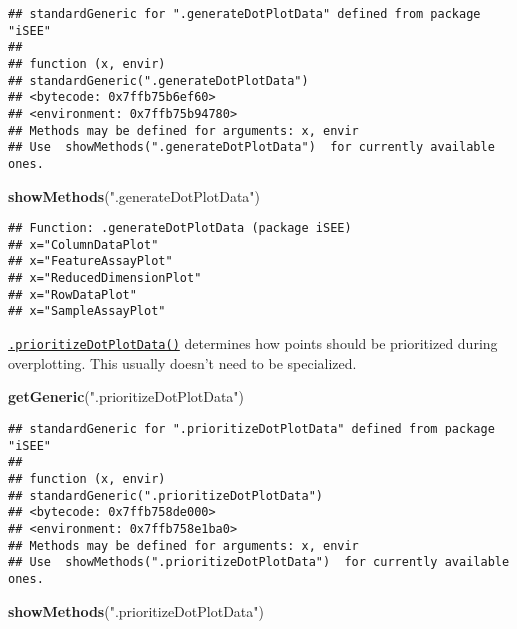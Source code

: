 \documentclass[
]{book}
\newenvironment{Shaded}{\begin{snugshade}}{\end{snugshade}}
\newcommand{\KeywordTok}[1]{\textcolor[rgb]{0.13,0.29,0.53}{\textbf{#1}}}
\newcommand{\NormalTok}[1]{#1}
\newcommand{\StringTok}[1]{\textcolor[rgb]{0.31,0.60,0.02}{#1}}
\begin{document}
\begin{verbatim}
## standardGeneric for ".generateDotPlotData" defined from package "iSEE"
## 
## function (x, envir) 
## standardGeneric(".generateDotPlotData")
## <bytecode: 0x7ffb75b6ef60>
## <environment: 0x7ffb75b94780>
## Methods may be defined for arguments: x, envir
## Use  showMethods(".generateDotPlotData")  for currently available ones.
\end{verbatim}

\begin{Shaded}
\begin{Highlighting}[]
\KeywordTok{showMethods}\NormalTok{(}\StringTok{".generateDotPlotData"}\NormalTok{)}
\end{Highlighting}
\end{Shaded}

\begin{verbatim}
## Function: .generateDotPlotData (package iSEE)
## x="ColumnDataPlot"
## x="FeatureAssayPlot"
## x="ReducedDimensionPlot"
## x="RowDataPlot"
## x="SampleAssayPlot"
\end{verbatim}

\href{https://isee.github.io/iSEE/reference/plot-generics.html}{\texttt{.prioritizeDotPlotData()}} determines how points should be prioritized during overplotting.
This usually doesn't need to be specialized.

\begin{Shaded}
\begin{Highlighting}[]
\KeywordTok{getGeneric}\NormalTok{(}\StringTok{".prioritizeDotPlotData"}\NormalTok{)}
\end{Highlighting}
\end{Shaded}

\begin{verbatim}
## standardGeneric for ".prioritizeDotPlotData" defined from package "iSEE"
## 
## function (x, envir) 
## standardGeneric(".prioritizeDotPlotData")
## <bytecode: 0x7ffb758de000>
## <environment: 0x7ffb758e1ba0>
## Methods may be defined for arguments: x, envir
## Use  showMethods(".prioritizeDotPlotData")  for currently available ones.
\end{verbatim}

\begin{Shaded}
\begin{Highlighting}[]
\KeywordTok{showMethods}\NormalTok{(}\StringTok{".prioritizeDotPlotData"}\NormalTok{)}
\end{Highlighting}
\end{Shaded}
\end{document}
